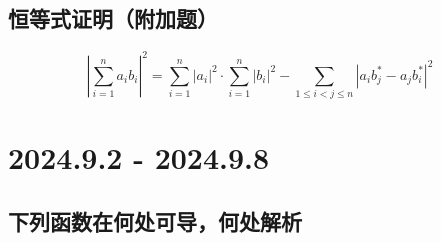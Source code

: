 \documentclass[UTF8]{report}
\theoremstyle{MyLineTheoremStyle} %
\theoremstyle{MyBlockTheoremStyle} %
\theoremstyle{MySubsubsectionStyle} %
\begin{document}
\section{恒等式证明（附加题）}

\begin{equation*}
\left| \sum_{i=1}^{n} a_ib_i \right| ^2 
= \sum_{i=1}^{n} | a_i |^2 \cdot \sum_{i=1}^{n} | b_i |^2 - \sum_{1 \leqslant i <j \leqslant n} \left|  a_ib_j^* - a_jb_i^*  \right|^2  
\end{equation*}



\chapter{2024.9.2 - 2024.9.8}\thispagestyle{fancy}


\section{下列函数在何处可导，何处解析}
\end{document}
